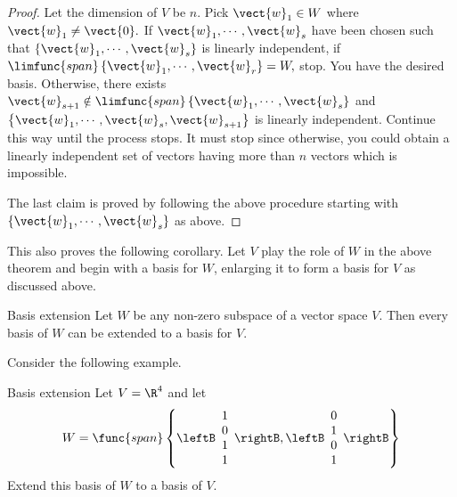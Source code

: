 \begin{proof}
Let the dimension of $V$ be $n$. Pick $\vect{w}_{1}\in W$
where $\vect{w}_{1}\neq \vect{0}.$ If $\vect{w}_{1},\cdots ,\vect{w}_{s}$ have
been chosen such that $\left\{ \vect{w}_{1},\cdots ,\vect{w}_{s}\right\} $ is
linearly independent, if $\limfunc{span}\left\{ \vect{w}_{1},\cdots ,\vect{w}
_{r}\right\} =W,$ stop. You have the desired basis. Otherwise, there exists $
\vect{w}_{s+1}\notin \limfunc{span}\left\{ \vect{w}_{1},\cdots ,\vect{w}
_{s}\right\} $ and $\left\{ \vect{w}_{1},\cdots ,
\vect{w}_{s},\vect{w}_{s+1}\right\} $ is linearly independent. Continue this
way until the process stops. It must stop since otherwise, you could obtain a
linearly independent set of vectors having more than $n$ vectors which is
impossible.

The last claim is proved by following the above procedure starting with $
\left\{ \vect{w}_{1},\cdots ,\vect{w}_{s}\right\} $ as above. 
\end{proof}

This also proves the following corollary. Let $V$ play the role of $
W$ in the above theorem and begin with a basis for $W$, enlarging it to form
a basis for $V$ as discussed above.

\begin{corollary}{Basis extension}{}
Let $W$ be any non-zero subspace of a vector space $V$.
Then every basis of $W$ can be extended to a basis for $V$.
\end{corollary}

Consider the following example.

\begin{example}{Basis extension}{}
Let $V=\R^{4}$ and let 
\begin{equation*}
W=\func{span}\left\{ \leftB 
\begin{array}{c}
1 \\ 
0 \\ 
1 \\ 
1
\end{array}
\rightB ,\leftB 
\begin{array}{c}
0 \\ 
1 \\ 
0 \\ 
1
\end{array}
\rightB \right\}
\end{equation*}
Extend this basis of $W$ to a basis of $V$.
\end{example}

